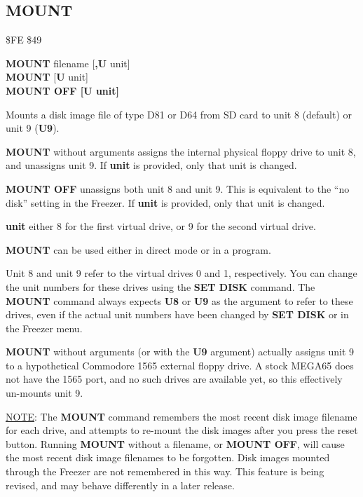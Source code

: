 \subsection{MOUNT}
\begin{description}[leftmargin=2cm,style=nextline]
\item [Token:]    \$FE \$49

\item [Format:]   {\bf MOUNT} filename [{\bf,U} unit] \\
                  {\bf MOUNT} [{\bf U} unit] \\
                  {\bf MOUNT OFF [{\bf U} unit]}

\item [Usage:]    Mounts a disk image file of type D81 or D64 from SD card to unit 8 (default) or unit 9 ({\bf U9}).

                  {\bf MOUNT} without arguments assigns the internal physical floppy drive to unit 8, and unassigns unit 9. If {\bf unit} is provided, only that unit is changed.

                  {\bf MOUNT OFF} unassigns both unit 8 and unit 9. This is equivalent to the ``no disk'' setting in the Freezer. If {\bf unit} is provided, only that unit is changed.

                  \filenamedefinition

                  {\bf unit} either 8 for the first virtual drive, or 9 for the second virtual drive.

\item [Remarks:]  {\bf MOUNT} can be used either in direct mode or in a program.

                  Unit 8 and unit 9 refer to the virtual drives 0 and 1, respectively. You can change the unit numbers for these drives using the {\bf SET DISK} command. The {\bf MOUNT} command always expects {\bf U8} or {\bf U9} as the argument to refer to these drives, even if the actual unit numbers have been changed by {\bf SET DISK} or in the Freezer menu.

                  {\bf MOUNT} without arguments (or with the {\bf U9} argument) actually assigns unit 9 to a hypothetical Commodore 1565 external floppy drive. A stock MEGA65 does not have the 1565 port, and no such drives are available yet, so this effectively un-mounts unit 9.

                  \underline{NOTE}: The {\bf MOUNT} command remembers the most recent disk image filename for each drive, and attempts to re-mount the disk images after you press the reset button. Running {\bf MOUNT} without a filename, or {\bf MOUNT OFF}, will cause the most recent disk image filenames to be forgotten. Disk images mounted through the Freezer are not remembered in this way. This feature is being revised, and may behave differently in a later release.


\end{description}
